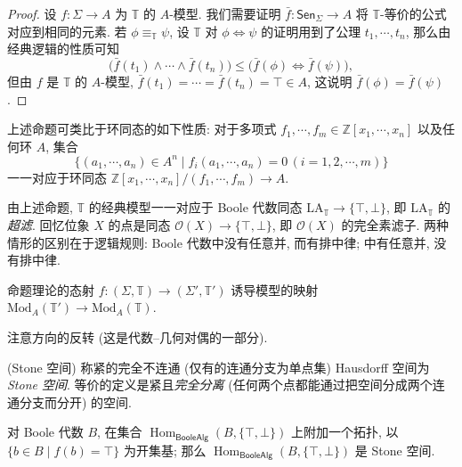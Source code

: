 \begin{proof}
	设 $f\colon \Sigma\to A$ 为 $\mathbb T$ 的 $A$-模型. 我们需要证明 $\bar f\colon \mathsf {Sen}_\Sigma\to A$ 将 $\mathbb T$-等价的公式对应到相同的元素. 若 $\phi \equiv_{\mathbb T} \psi$, 设 $\mathbb T$ 对 $\phi \Leftrightarrow\psi$ 的证明用到了公理 $t_1,\cdots,t_n$, 那么由经典逻辑的性质可知
	$$
	\big( \bar f(t_1) \land \cdots \land \bar f (t_n) \big) \leq \big( \bar f(\phi) \Leftrightarrow \bar f(\psi) \big),
	$$
	但由 $f$ 是 $\mathbb T$ 的 $A$-模型, $\bar f(t_1)=\cdots = \bar f(t_n) = \top\in A$, 这说明 $\bar f(\phi) = \bar f(\psi)$.
\end{proof}

\begin{remark}
	{}
	上述命题可类比于环同态的如下性质:
	对于多项式 $f_1,\cdots,f_m\in \mathbb{Z}[x_1,\cdots,x_n]$ 以及任何环 $A$, 集合
	$$
	\big\{
	(a_1,\cdots,a_n)\in A^n\mid f_i(a_1,\cdots,a_n)=0\,(i=1,2,\cdots,m)
	\big\}
	$$
	一一对应于环同态 $\mathbb{Z}[x_1,\cdots,x_n]/(f_1,\cdots,f_m) \to A$.
\end{remark}

\begin{remark}
	{}
	由上述命题, $\mathbb T$ 的经典模型一一对应于 Boole 代数同态 $\text{LA}_{\mathbb T} \to \{\top,\bot\}$, 即 $\text{LA}_{\mathbb T}$ 的\emph{超滤}.
	回忆位象 $X$ 的点是\fm{}同态 $\mathcal O(X) \to \{\top,\bot\}$, 即 $\mathcal O(X)$ 的完全素滤子. 两种情形的区别在于逻辑规则: Boole 代数中没有任意并, 而有排中律; \fm{}中有任意并, 没有排中律.
\end{remark}

\begin{prop}
	{}
	命题理论的态射 $f\colon (\Sigma,\mathbb T) \to (\Sigma',\mathbb T')$ 诱导模型的映射 $\text{Mod}_A(\mathbb T') \to \text{Mod}_A(\mathbb T)$.
\end{prop}

注意方向的反转 (这是代数--几何对偶的一部分).

\begin{definition}
	{(Stone 空间)}
	称紧的完全不连通 (仅有的连通分支为单点集) Hausdorff 空间为 \emph{Stone 空间}. 等价的定义是紧且\emph{完全分离} (任何两个点都能通过把空间分成两个连通分支而分开) 的空间.
\end{definition}

\begin{propdef}
	{}
	对 Boole 代数 $B$, 在集合 $\operatorname{Hom}_{\mathsf {BooleAlg}}(B,\{\top,\bot\})$ 上附加一个拓扑, 以 $\{b\in B\mid f(b)=\top\}$ 为开集基; 那么 $\operatorname{Hom}_{\mathsf {BooleAlg}}(B,\{\top,\bot\})$ 是 Stone 空间.
\end{propdef}

